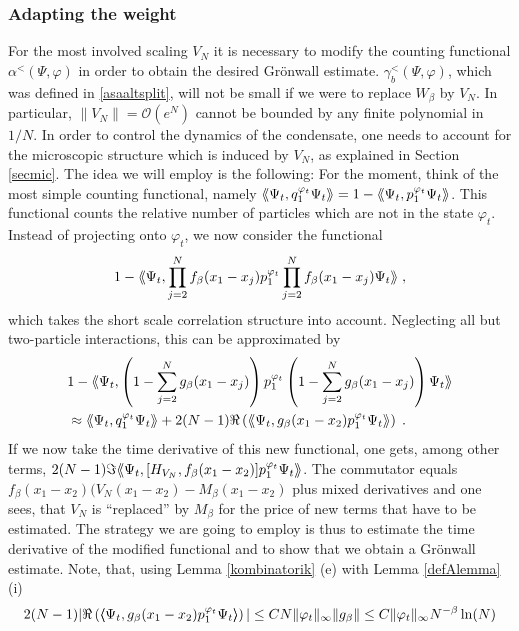 \documentclass[11pt, english, american]{article}
\newcommand{\llaa}{\left\langle\hspace{-0.14cm}\left\langle}
\newcommand{\rraa}{\right\rangle\hspace{-0.14cm}\right\rangle}
\newcommand{\laa}{\langle\hspace{-0.08cm}\langle}
\newcommand{\raa}{\rangle\hspace{-0.08cm}\rangle}
\renewcommand{\phi}{\varphi}
\begin{document}
\subsubsection{Adapting the weight}
For the most involved scaling $V_N$ it is necessary to modify the counting functional $\alpha^ <(\Psi, \varphi)$ in order to obtain the desired Gr\"onwall estimate. $\gamma^<_b (\Psi, \phi)$, which was defined in \eqref{asaaltsplit}, will not be small if we were to replace $W_\beta$ by $V_N$. 
 In particular, $ \|V_N\|=\mathcal{O}(e^{N})$ cannot be bounded by any finite polynomial in $1/N$.
In order to control the dynamics of the condensate, one needs to account for the
microscopic structure which is induced by  $V_N$, as explained in Section \ref{secmic}.
The idea we will employ is the following: 
For the moment, think of the most simple counting functional, namely
 $\laa\Psi_t,q^{\phi_t}_1\Psi_t\raa=1-\laa\Psi_t,p^{\phi_t}_1\Psi_t\raa$. This functional counts the relative number of particles which are not in the state $\phi_t$. Instead of projecting onto $\phi_t$, we now consider the functional
 $$1-\laa\Psi_t,\prod_{j=2}^Nf_{\beta}(x_1-x_j)p^{\phi_t}_1\prod_{j=2}^Nf_{\beta}(x_1-x_j)\Psi_t\raa\;,$$ which takes the short scale correlation structure into account.
 Neglecting all but two-particle interactions, this can be approximated by
\begin{align*}&1-\laa\Psi_t,\left(1-\sum_{j=2}^Ng_{\beta}(x_1-x_j)\right)p^{\phi_t}_1\left(1-\sum_{j=2}^Ng_{\beta}(x_1-x_j)\right)\Psi_t\raa
%
\\& \approx\laa\Psi_t,q^{\phi_t}_1\Psi_t\raa+2(N-1)\Re\left(\laa\Psi_t
, g_{\beta}(x_{1}-x_{2}) p^{\phi_t}_1
\Psi_t\raa\right)\;.
\end{align*}
 If we now take the time derivative of this new functional, one gets, among other terms,
 $ 2
 (N-1)
 \Im
 \laa \Psi_t,
 [H_{V_N},f_\beta(x_1-x_2) ]p^{\phi_t}_1
 \Psi_t \raa$. The commutator equals $f_{\beta}(x_1-x_2)(V_{N}(x_1-x_2)-M_{\beta}(x_1-x_2)$ plus mixed derivatives and one
sees, that $V_N$ is ``replaced''
by $M_{\beta}$ for the price of new terms that have to be estimated. 
The strategy we are going to employ is thus to estimate the time derivative of the modified functional and to show that we obtain a Gr\"onwall estimate.
Note, that, using Lemma \ref{kombinatorik} (e) with Lemma \ref{defAlemma} (i)
\begin{equation*}
2(N-1)|\Re\left(\llaa\Psi_t
, g_{\beta}(x_{1}-x_{2})  p^{\phi_t}_1
\Psi_t\rraa\right)|
\leq CN
\|\phi_t\|_\infty
\|g_\beta\|
\leq C
\|\phi_t\|_\infty
N^{-\beta} \ln(N)
\end{equation*} 
\end{document}

